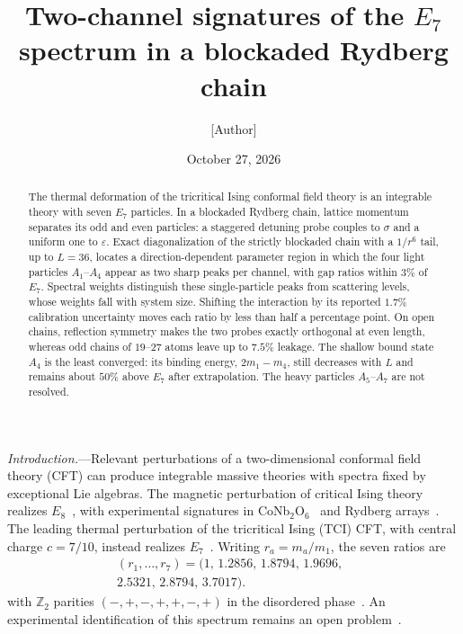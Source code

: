 \documentclass[aps,prl,twocolumn,superscriptaddress,showpacs,floatfix,10pt]{revtex4-2}
\begin{document}
\title{Two-channel signatures of the \texorpdfstring{$E_7$}{E7} spectrum in a blockaded Rydberg chain}
\author{[Author]}
\affiliation{[Affiliation]}
\date{October 27, 2026}

\begin{abstract}
The thermal deformation of the tricritical Ising conformal field theory is an
integrable theory with seven $E_7$ particles. In a blockaded Rydberg chain, lattice
momentum separates its odd and even particles: a staggered detuning probe couples
to $\sigma$ and a uniform one to $\varepsilon$. Exact diagonalization of the
strictly blockaded chain with a $1/r^6$ tail, up to $L=36$, locates a
direction-dependent parameter region in which the four light particles
$A_1$--$A_4$ appear as two sharp peaks per channel, with gap ratios within
$3\%$ of $E_7$. Spectral weights distinguish these single-particle peaks from
scattering levels, whose weights fall with system size. Shifting the interaction by
its reported $1.7\%$ calibration uncertainty moves each ratio by less than
half a percentage point. On open chains, reflection symmetry makes the two probes
exactly orthogonal at even length, whereas odd chains of $19$--$27$ atoms leave
up to $7.5\%$ leakage. The shallow bound state $A_4$ is the least converged: its
binding energy, $2m_1-m_4$, still decreases with $L$ and remains about $50\%$
above $E_7$ after extrapolation. The heavy particles $A_5$--$A_7$ are not resolved.
\end{abstract}

\maketitle

\emph{Introduction.}---Relevant perturbations of a two-dimensional conformal
field theory (CFT) can produce integrable massive theories with spectra fixed by
exceptional Lie algebras. The magnetic perturbation of critical Ising theory
realizes $E_8$~\cite{Zamolodchikov1989}, with experimental signatures in
CoNb$_2$O$_6$~\cite{Coldea2010} and Rydberg arrays~\cite{Vovrosh2025}.
The leading thermal perturbation of the tricritical Ising (TCI) CFT, with central
charge $c=7/10$, instead realizes $E_7$~\cite{Christe1990,Fateev1990,Acerbi1996}.
Writing $r_a=m_a/m_1$, the seven ratios are
\begin{multline}
 (r_1,\ldots,r_7)=(1,\,1.2856,\,1.8794,\,1.9696,\,\phantom{)}\\
 2.5321,\,2.8794,\,3.7017).
 \label{eq:masses}
\end{multline}
with $\mathbb Z_2$ parities $(-,+,-,+,+,-,+)$ in the disordered
phase~\cite{Lepori2008}. An experimental identification of this spectrum remains
an open problem~\cite{Mussardo2022}.
\end{document}
